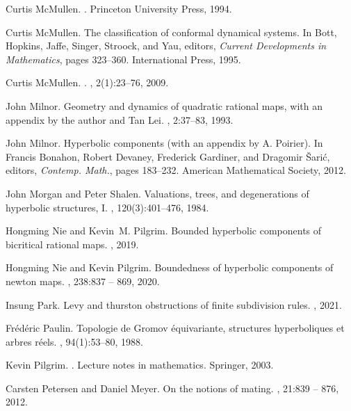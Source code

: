 \documentclass[11pt, reqno]{amsart}
\numberwithin{equation}{section}
\theoremstyle{plain}
\theoremstyle{theorem}
\theoremstyle{definition}
\numberwithin{figure}{section}
\begin{document}
\begin{thebibliography}{DPWY20}
Curtis McMullen.
.
\newblock Princeton University Press, 1994.

Curtis McMullen.
\newblock The classification of conformal dynamical systems.
\newblock In Bott, Hopkins, Jaffe, Singer, Stroock, and Yau, editors, {\em
  Current Developments in Mathematics}, pages 323--360. International Press,
  1995.

Curtis McMullen.
.
, 2(1):23--76, 2009.

John Milnor.
\newblock Geometry and dynamics of quadratic rational maps, with an appendix by
  the author and Tan Lei.
, 2:37--83, 1993.

John Milnor.
\newblock Hyperbolic components (with an appendix by A. Poirier).
\newblock In Francis Bonahon, Robert Devaney, Frederick Gardiner, and Dragomir
  \v{S}ari\'c, editors, {\em Contemp. Math.}, pages 183--232. American
  Mathematical Society, 2012.

John Morgan and Peter Shalen.
\newblock Valuations, trees, and degenerations of hyperbolic structures, {I}.
, 120(3):401--476, 1984.

Hongming Nie and Kevin~M. Pilgrim.
\newblock Bounded hyperbolic components of bicritical rational maps.
, 2019.

Hongming Nie and Kevin Pilgrim.
\newblock Boundedness of hyperbolic components of newton maps.
, 238:837 -- 869, 2020.

Insung Park.
\newblock Levy and thurston obstructions of finite subdivision rules.
, 2021.

Fr{\'e}d{\'e}ric Paulin.
\newblock Topologie de {Gromov} {\'e}quivariante, structures hyperboliques et
  arbres r{\'e}els.
, 94(1):53--80, 1988.

Kevin Pilgrim.
.
\newblock Lecture notes in mathematics. Springer, 2003.

Carsten Petersen and Daniel Meyer.
\newblock On the notions of mating.
, 21:839 --
  876, 2012.


\end{thebibliography}
\end{document}
